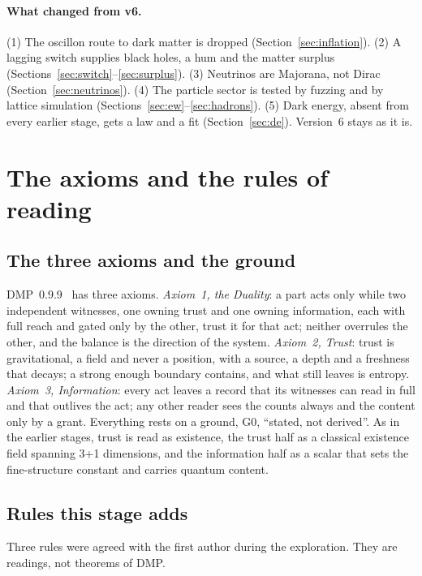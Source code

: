 \documentclass[11pt,a4paper]{article}
\begin{document}
\paragraph{What changed from v6.} (1) The oscillon route to dark matter is dropped (Section~\ref{sec:inflation}). (2) A lagging switch
supplies black holes, a hum and the matter surplus (Sections~\ref{sec:switch}--\ref{sec:surplus}). (3) Neutrinos are Majorana, not Dirac
(Section~\ref{sec:neutrinos}). (4) The particle sector is tested by fuzzing and by lattice simulation (Sections~\ref{sec:ew}--\ref{sec:hadrons}).
(5) Dark energy, absent from every earlier stage, gets a law and a fit (Section~\ref{sec:de}). Version~6 stays as it is.

\section{The axioms and the rules of reading}\label{sec:axioms}

\subsection{The three axioms and the ground}
DMP~0.9.9~\cite{dmp} has three axioms. \emph{Axiom~1, the Duality}: a part acts only while two independent witnesses, one owning trust
and one owning information, each with full reach and gated only by the other, trust it for that act; neither overrules the other, and
the balance is the direction of the system. \emph{Axiom~2, Trust}: trust is gravitational, a field and never a position, with a source,
a depth and a freshness that decays; a strong enough boundary contains, and what still leaves is entropy. \emph{Axiom~3, Information}:
every act leaves a record that its witnesses can read in full and that outlives the act; any other reader sees the counts always and the
content only by a grant. Everything rests on a ground, G0, ``stated, not derived''. As in the earlier stages, trust is read as existence,
the trust half as a classical existence field spanning 3+1 dimensions, and the information half as a scalar that sets the fine-structure
constant and carries quantum content.

\subsection{Rules this stage adds}
Three rules were agreed with the first author during the exploration. They are readings, not theorems of DMP.
\end{document}
